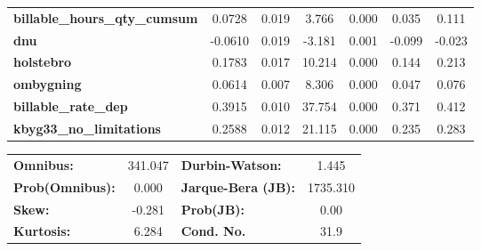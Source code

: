 \begin{center}
\begin{tabular}{lcccccc}
\textbf{billable\_hours\_qty\_cumsum}    &       0.0728  &        0.019     &     3.766  &         0.000        &        0.035    &        0.111     \\
\textbf{dnu}                             &      -0.0610  &        0.019     &    -3.181  &         0.001        &       -0.099    &       -0.023     \\
\textbf{holstebro}                       &       0.1783  &        0.017     &    10.214  &         0.000        &        0.144    &        0.213     \\
\textbf{ombygning}                       &       0.0614  &        0.007     &     8.306  &         0.000        &        0.047    &        0.076     \\
\textbf{billable\_rate\_dep}             &       0.3915  &        0.010     &    37.754  &         0.000        &        0.371    &        0.412     \\
\textbf{kbyg33\_no\_limitations}         &       0.2588  &        0.012     &    21.115  &         0.000        &        0.235    &        0.283     \\
\bottomrule
\end{tabular}
\begin{tabular}{lclc}
\textbf{Omnibus:}       & 341.047 & \textbf{  Durbin-Watson:     } &    1.445  \\
\textbf{Prob(Omnibus):} &   0.000 & \textbf{  Jarque-Bera (JB):  } & 1735.310  \\
\textbf{Skew:}          &  -0.281 & \textbf{  Prob(JB):          } &     0.00  \\
\textbf{Kurtosis:}      &   6.284 & \textbf{  Cond. No.          } &     31.9  \\
\bottomrule
\end{tabular}
\end{center}
